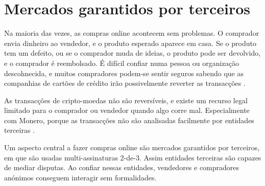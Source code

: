 \chapter{Mercados garantidos por terceiros}
\label{chapter:escrowed-market}

Na maioria das vezes, as compras online acontecem sem problemas. O comprador envia dinheiro ao vendedor, e o produto esperado aparece em casa. Se o produto tem um defeito, ou se o comprador muda de ideias, o produto pode ser devolvido, e o comprador é reembolsado.   
É difícil confiar numa pessoa ou organização descohnecida, e muitos compradores podem-se sentir seguros sabendo que as companhias de cartões de crédito irão possivelmente reverter as transacções \cite{credit-card-reversals}.   


As transacções de cripto-moedas não são reversíveis, e existe um recurso legal limitado para o comprador ou vendedor quando algo corre mal. Especialmente com Monero, porque as transacções não são analisadas facilmente por entidades terceiras \cite{chainalysis-2020-report}.   

Um aspecto central a fazer compras online são mercados garantidos por terceiros, em que são usadas multi-assinaturas 2-de-3. Assim entidades terceiras são capazes de mediar disputas. Ao confiar nessas entidades, vendedores e compradores anónimos conseguem interagir sem formalidades. 


